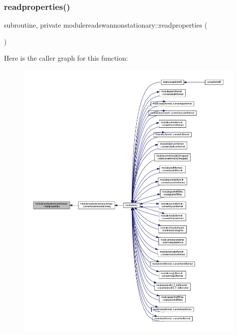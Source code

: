 \subsubsection{\texorpdfstring{readproperties()}{readproperties()}}
{\footnotesize\ttfamily subroutine, private modulereadswannonstationary\+::readproperties (\begin{DoxyParamCaption}{ }\end{DoxyParamCaption})\hspace{0.3cm}{\ttfamily [private]}}

Here is the caller graph for this function\+:\nopagebreak
\begin{figure}[H]
\begin{center}
\leavevmode
\includegraphics[width=350pt]{namespacemodulereadswannonstationary_a2326a23b25b70dbf6d20a3f4395d864e_icgraph}
\end{center}
\end{figure}
\mbox{\label{namespacemodulereadswannonstationary_a209b3d9c5ca27190c2be35a7d9bb9bce}} 
